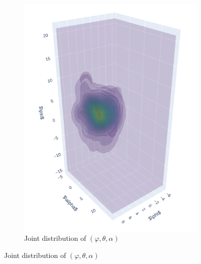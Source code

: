 \documentclass[a4paper,12pt]{article}
\theoremstyle{definition}
\begin{document}
\begin{figure}[htbp]
\begin{subfigure}[b]{0.3\textwidth}
        \includegraphics[width=\textwidth]{VariableSelectionPsi/joint3d_phi_alpha_psi.png}
        \caption{Joint distribution of \((\varphi, \theta, \alpha)\)}
        \label{fig:joint3D_phi_alpha_psi}
    \end{subfigure}


\end{figure}
\end{document}
